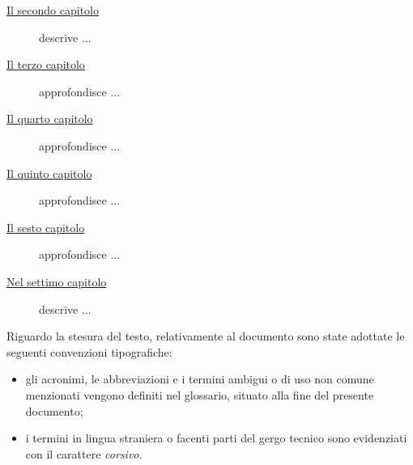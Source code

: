 \begin{description}
    \item[{\hyperref[chap:processi-metodologie]{Il secondo capitolo}}] descrive ...
    
    \item[{\hyperref[chap:descrizione-stage]{Il terzo capitolo}}] approfondisce ...
    
    \item[{\hyperref[chap:analisi-requisiti]{Il quarto capitolo}}] approfondisce ...
    
    \item[{\hyperref[chap:progettazione-codifica]{Il quinto capitolo}}] approfondisce ...
    
    \item[{\hyperref[chap:verifica-validazione]{Il sesto capitolo}}] approfondisce ...
    
    \item[{\hyperref[chap:conclusioni]{Nel settimo capitolo}}] descrive ...
\end{description}

Riguardo la stesura del testo, relativamente al documento sono state adottate le seguenti convenzioni tipografiche:
\begin{itemize}
	\item gli acronimi, le abbreviazioni e i termini ambigui o di uso non comune menzionati vengono definiti nel glossario, situato alla fine del presente documento;
	\item i termini in lingua straniera o facenti parti del gergo tecnico sono evidenziati con il carattere \emph{corsivo}.
\end{itemize}
